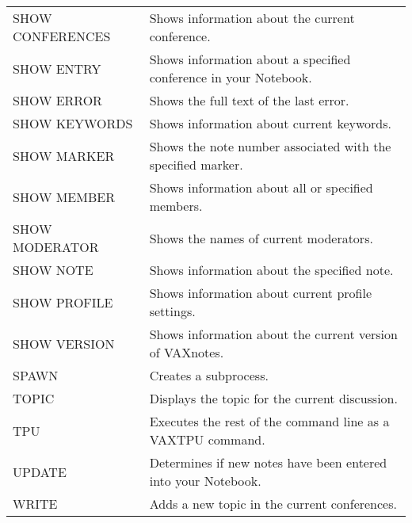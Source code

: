 \begin{tabular}{ l l }
SHOW CONFERENCES	& Shows information about the current conference.\\
SHOW ENTRY		& Shows information about a specified conference in your Notebook.\\
SHOW ERROR		& Shows the full text of the last error.\\
SHOW KEYWORDS		& Shows information about current keywords.\\
SHOW MARKER		& Shows the note number associated with the specified marker.\\
SHOW MEMBER		& Shows information about all or specified members.\\
SHOW MODERATOR		& Shows the names of current moderators.\\
SHOW NOTE		& Shows information about the specified note.\\
SHOW PROFILE		& Shows information about current profile settings.\\
SHOW VERSION		& Shows information about the current version of VAXnotes.\\
SPAWN			& Creates a subprocess.\\
TOPIC			& Displays the topic for the current discussion.\\
TPU			& Executes the rest of the command line as a VAXTPU command.\\
UPDATE			& Determines if new notes have been entered into your Notebook.\\
WRITE			& Adds a new topic in the current conferences.\\
\end{tabular}

 
